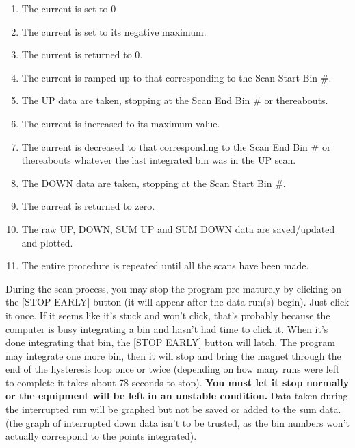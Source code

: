 \documentclass{../lab}
\begin{document}
\begin{enumerate}
    \item The current is set to 0

    \item The current is set to its negative maximum.

    \item The current is returned to 0.

    \item The current is ramped up to that corresponding to the Scan Start Bin \#.

    \item The UP data are taken, stopping at the Scan End Bin \# or thereabouts.

    \item The current is increased to its maximum value.

    \item The current is decreased to that corresponding to the Scan End Bin \# or thereabouts whatever the last integrated bin was in the UP scan.

    \item The DOWN data are taken, stopping at the Scan Start Bin \#.

    \item The current is returned to zero.

    \item The raw UP, DOWN, SUM UP and SUM DOWN data are saved/updated and plotted.

    \item The entire procedure is repeated until all the scans have been made.

\end{enumerate}

During the scan process, you may stop the program pre-maturely by clicking on the [STOP EARLY] button (it will appear after the data run(s) begin). Just click it once. If it seems like it's stuck and won't click, that's probably because the computer is busy integrating a bin and hasn't had time to click it. When it's done integrating that bin, the [STOP EARLY] button will latch. The program may integrate one more bin, then it will stop and bring the magnet through the end of the hysteresis loop once or twice (depending on how many runs were left to complete it takes about 78 seconds to stop). \textbf{You must let it stop normally or the equipment will be left in an unstable condition.} Data taken during the interrupted run will be graphed but not be saved or added to the sum data. (the graph of interrupted down data isn't to be trusted, as the bin numbers won't actually correspond to the points integrated).
\end{document}
